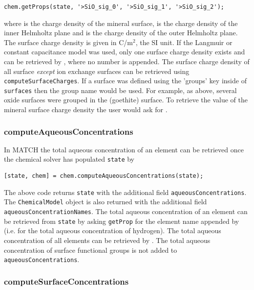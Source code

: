 \documentclass{article}
\begin{document}
\begin{lstlisting}
chem.getProps(state, '>SiO_sig_0', '>SiO_sig_1', '>SiO_sig_2');
\end{lstlisting}
where  is the charge density of the mineral surface,  is the charge density of the inner Helmholtz plane and  is the charge density of the outer Helmholtz plane. The surface charge density is given in C/m$^2$, the SI unit. If the Langmuir or constant capacitance model was used, only one surface charge density exists and can be retrieved by , where no number is appended. The surface charge density of all surface \emph{except} ion exchange surfaces can be retrieved using \verb|computeSurfaceCharges|. If a surface was defined using the 'groups' key inside of \verb|surfaces| then the group name would be used. For example, as above, several oxide surfaces were grouped in the  (goethite) surface. To retrieve the value of the mineral surface charge density the user would ask for .

\subsubsection{computeAqueousConcentrations}

In MATCH the total aqueous concentration of an element can be retrieved once the chemical solver has populated \verb|state| by

\begin{lstlisting}
[state, chem] = chem.computeAqueousConcentrations(state);
\end{lstlisting}
The above code returns \verb|state| with the additional field \verb|aqueousConcentrations|. The \verb|ChemicalModel| object is also returned with the additional field \verb|aqueousConcentrationNames|. The total aqueous concentration of an element can be retrieved from \verb|state| by asking \verb|getProp| for the element name appended by  (i.e.  for the total aqueous concentration of hydrogen). The total aqueous concentration of all elements can be retrieved by . The total aqueous concentration of surface functional groups is not added to \verb|aqueousConcentrations|.

\subsubsection{computeSurfaceConcentrations}
\end{document}
